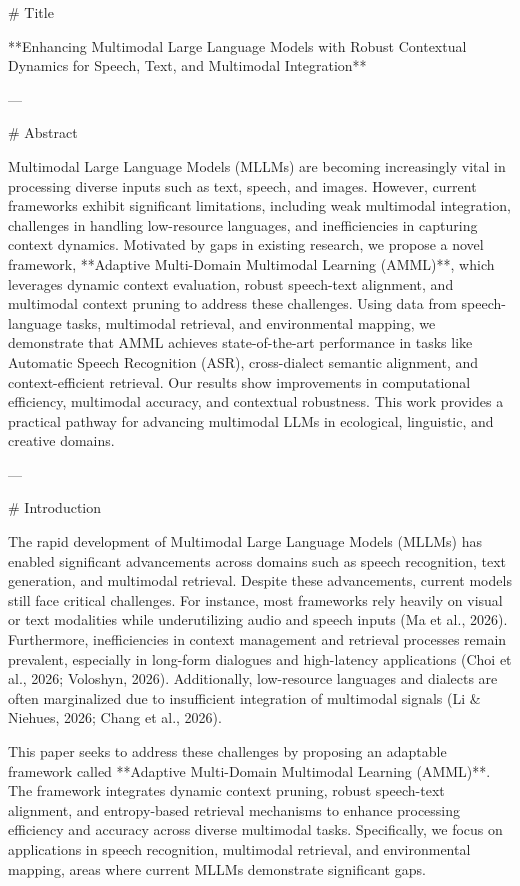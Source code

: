 # Title

**Enhancing Multimodal Large Language Models with Robust Contextual Dynamics for Speech, Text, and Multimodal Integration**

---

# Abstract

Multimodal Large Language Models (MLLMs) are becoming increasingly vital in processing diverse inputs such as text, speech, and images. However, current frameworks exhibit significant limitations, including weak multimodal integration, challenges in handling low-resource languages, and inefficiencies in capturing context dynamics. Motivated by gaps in existing research, we propose a novel framework, **Adaptive Multi-Domain Multimodal Learning (AMML)**, which leverages dynamic context evaluation, robust speech-text alignment, and multimodal context pruning to address these challenges. Using data from speech-language tasks, multimodal retrieval, and environmental mapping, we demonstrate that AMML achieves state-of-the-art performance in tasks like Automatic Speech Recognition (ASR), cross-dialect semantic alignment, and context-efficient retrieval. Our results show improvements in computational efficiency, multimodal accuracy, and contextual robustness. This work provides a practical pathway for advancing multimodal LLMs in ecological, linguistic, and creative domains.

---

# Introduction

The rapid development of Multimodal Large Language Models (MLLMs) has enabled significant advancements across domains such as speech recognition, text generation, and multimodal retrieval. Despite these advancements, current models still face critical challenges. For instance, most frameworks rely heavily on visual or text modalities while underutilizing audio and speech inputs (Ma et al., 2026). Furthermore, inefficiencies in context management and retrieval processes remain prevalent, especially in long-form dialogues and high-latency applications (Choi et al., 2026; Voloshyn, 2026). Additionally, low-resource languages and dialects are often marginalized due to insufficient integration of multimodal signals (Li & Niehues, 2026; Chang et al., 2026).

This paper seeks to address these challenges by proposing an adaptable framework called **Adaptive Multi-Domain Multimodal Learning (AMML)**. The framework integrates dynamic context pruning, robust speech-text alignment, and entropy-based retrieval mechanisms to enhance processing efficiency and accuracy across diverse multimodal tasks. Specifically, we focus on applications in speech recognition, multimodal retrieval, and environmental mapping, areas where current MLLMs demonstrate significant gaps.

